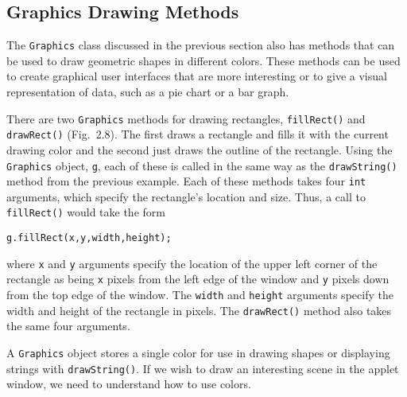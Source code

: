 \begin{figure}[h]
\figascaled{chptr02/drawstr.eps}{0.75}{``Hello World'' is drawn
at coordinate (10, 10) and ``Welcome to Java'' at
(10, 35) on the applet window.
\label{fig-drawstr}
\label{pg-fig-drawstr}}
\end{figure}

\subsection{Graphics Drawing Methods}

The {\tt Graphics} class discussed in the previous section also has
methods that can be used to draw geometric shapes in different
colors. These methods can be used to create graphical user interfaces
that are more interesting or to give a visual representation of data,
such as a pie chart or a bar graph.

There are two {\tt Graphics} methods for drawing rectangles, 
{\tt fillRect()} and {\tt drawRect()} (Fig.~2.8). The
first draws a rectangle and fills it with the current drawing color
and the second just draws the outline of the rectangle.  Using the
{\tt Graphics} object, {\tt g}, each of these is called in the same
way as the {\tt drawString()} method from the previous example.  
Each of these methods takes four {\tt int} arguments, which specify 
the rectangle's location and size. Thus, a call to {\tt fillRect()}
would take the form

\begin{jjjlisting}
\begin{lstlisting}
g.fillRect(x,y,width,height);
\end{lstlisting}
\end{jjjlisting}

\noindent where {\tt x} and {\tt y} arguments specify the location of 
the upper left corner of the rectangle as being {\tt x} pixels from
the left edge of the window and {\tt y} pixels down from the top edge
of the window. The {\tt width} and {\tt height} arguments specify the
width and height of the rectangle in pixels.  The {\tt drawRect()}
method also takes the same four arguments. 

A {\tt Graphics} object stores a single color for use in drawing
shapes or displaying strings with {\tt drawString()}.  If we wish to
draw an interesting scene in the applet window, we need to understand
how to use colors.

